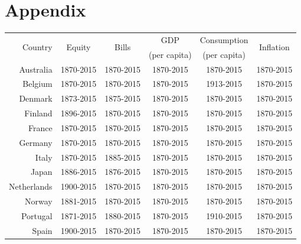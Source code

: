 \section*{Appendix}

{\renewcommand{\arraystretch}{1.5}
\begin{table}[H]
\begin{center}
\begin{tabular}{rccccc}
\hline
\hline
\multirow{2}{*}{Country} & \multirow{2}{*}{Equity} & \multirow{2}{*}{Bills} & GDP & Consumption & \multirow{2}{*}{Inflation}\\
& & & (per capita) & (per capita) &\\
\hline

Australia & 1870-2015 & 1870-2015 & 1870-2015 & 1870-2015 & 1870-2015 \\ 

Belgium & 1870-2015 & 1870-2015 & 1870-2015 & 1913-2015 & 1870-2015 \\ 

Denmark & 1873-2015 & 1875-2015 & 1870-2015 & 1870-2015 & 1870-2015 \\ 

Finland & 1896-2015 & 1870-2015 & 1870-2015 & 1870-2015 & 1870-2015 \\ 

France & 1870-2015 & 1870-2015 & 1870-2015 & 1870-2015 & 1870-2015 \\ 

Germany & 1870-2015 & 1870-2015 & 1870-2015 & 1870-2015 & 1870-2015 \\ 

Italy & 1870-2015 & 1885-2015 & 1870-2015 & 1870-2015 & 1870-2015 \\ 

Japan & 1886-2015 & 1876-2015 & 1870-2015 & 1870-2015 & 1870-2015 \\ 

Netherlands & 1900-2015 & 1870-2015 & 1870-2015 & 1870-2015 & 1870-2015 \\ 

Norway & 1881-2015 & 1870-2015 & 1870-2015 & 1870-2015 & 1870-2015 \\ 

Portugal & 1871-2015 & 1880-2015 & 1870-2015 & 1910-2015 & 1870-2015 \\ 

Spain & 1900-2015 & 1870-2015 & 1870-2015 & 1870-2015 & 1870-2015 \\ 


\end{tabular}
\end{center}
\end{table}}
